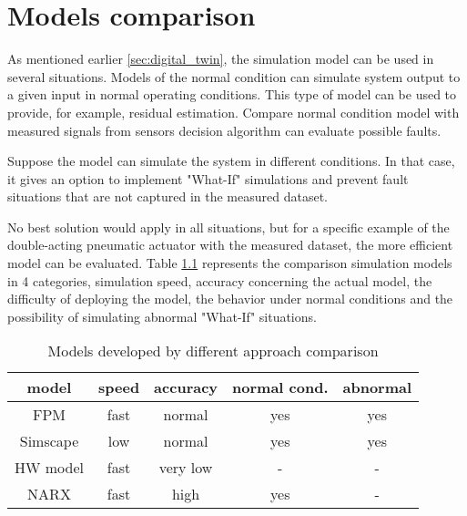 \chapter{Models comparison}

As mentioned earlier \ref{sec:digital_twin}, the simulation model can be used in several
situations.  Models of the normal condition can simulate system output to a
given input in normal operating conditions. This type of model can be used
to provide, for example, residual estimation. Compare normal condition
model with measured signals from sensors decision algorithm can evaluate
possible faults. 

Suppose the model can simulate the system in different conditions. In that
case, it gives an option to implement  "What-If" simulations and prevent
fault situations that are not captured in the measured dataset.

No best solution would apply in all situations, but for a specific example
of the double-acting pneumatic actuator with the measured dataset, the more
efficient model can be evaluated. Table \ref{tab:models_compare} represents the comparison
simulation models in 4 categories, simulation speed, accuracy concerning
the actual model, the difficulty of deploying the model, the behavior under
normal conditions and the possibility of simulating abnormal "What-If"
situations.

\begin{table}[h]
    \centering
    \begin{tabular}{|c|c|c|c|c|}
\hline
\textbf{model} &\textbf{speed} &\textbf{accuracy} &\textbf{normal cond.} &\textbf{abnormal} \\
\hline
FPM            & fast          & normal           & yes                  & yes \\
Simscape       & low           & normal           & yes                  & yes \\
HW model       & fast          & very low         & -                    & - \\
NARX           & fast          & high             & yes                  & - \\
\hline
    \end{tabular}
    \caption{Models developed by different approach comparison}
    \label{tab:models_compare}
\end{table}
    

